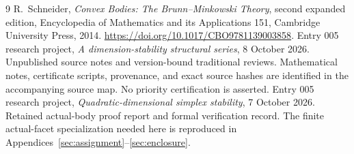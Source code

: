 \begin{thebibliography}{9}
R.~Schneider, \emph{Convex Bodies: The Brunn--Minkowski Theory}, second
expanded edition, Encyclopedia of Mathematics and its Applications 151,
Cambridge University Press, 2014.
\url{https://doi.org/10.1017/CBO9781139003858}.
Entry 005 research project, \emph{A dimension-stability structural series},
8 October 2026. Unpublished source notes and version-bound traditional
reviews. Mathematical notes, certificate scripts, provenance, and exact
source hashes are identified in the accompanying source map. No priority
certification is asserted.
Entry 005 research project, \emph{Quadratic-dimensional simplex stability},
7 October 2026. Retained actual-body proof report and formal verification
record. The finite actual-facet specialization needed here is reproduced
in Appendices~\ref{sec:assignment}--\ref{sec:enclosure}.
\end{thebibliography}
